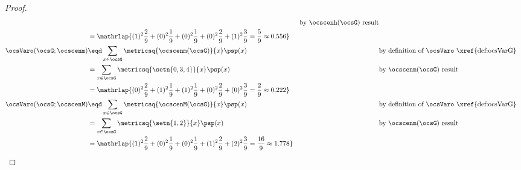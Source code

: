 \begin{tabstr}{0.75}
\begin{proof}
\begin{align*}
        && \text{by $\ocscenh(\ocsG)$ result}
      \\&= \mathrlap{
           (1)^2\frac{2}{9}+  %
           (0)^2\frac{1}{9}+  %
           (0)^2\frac{1}{9}+  %
           (0)^2\frac{2}{9}+  %
           (1)^2\frac{3}{9}   %
         = \frac{5}{9} \approx 0.556}
      \\
      \ocsVaro(\ocsG;\ocscenm)
        &\eqd \sum_{x\in\ocsG}\metricsq{\ocscenm(\ocsG)}{x}\psp(x)
        && \text{by definition of $\ocsVaro$ \xref{def:ocsVarG}}
      \\&= \sum_{x\in\ocsG}\metricsq{\setn{0,3,4}}{x}\psp(x)
        && \text{by $\ocscenm(\ocsG)$ result}
      \\&= \mathrlap{
           (0)^2\frac{2}{9}+  %
           (1)^2\frac{1}{9}+  %
           (1)^2\frac{1}{9}+  %
           (0)^2\frac{2}{9}+  %
           (0)^2\frac{3}{9}   %
         = \frac{2}{9} \approx 0.222}
      \\
      \ocsVaro(\ocsG;\ocscenM)
        &\eqd \sum_{x\in\ocsG}\metricsq{\ocscenM(\ocsG)}{x}\psp(x)
        && \text{by definition of $\ocsVaro$ \xref{def:ocsVarG}}
      \\&= \sum_{x\in\ocsG}\metricsq{\setn{1,2}}{x}\psp(x)
        && \text{by $\ocscenm(\ocsG)$ result}
      \\&= \mathrlap{
           (1)^2\frac{2}{9}+  %
           (0)^2\frac{1}{9}+  %
           (0)^2\frac{1}{9}+  %
           (1)^2\frac{2}{9}+  %
           (2)^2\frac{3}{9}   %
         = \frac{16}{9} \approx 1.778}
    \end{align*}
\end{proof}



\end{tabstr}

